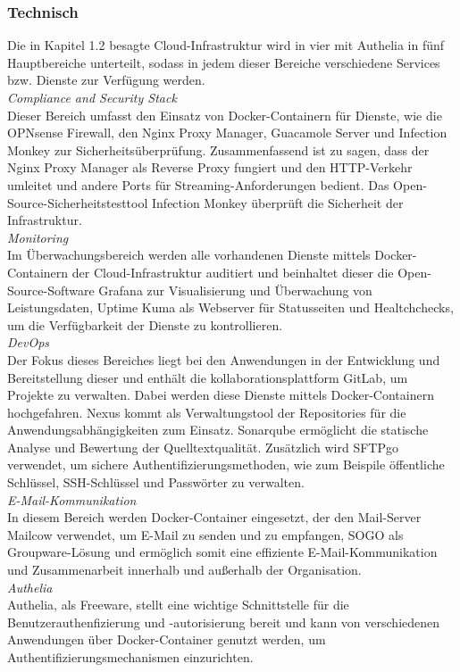 \subsubsection{Technisch}
\label{sec:Technisch}
Die in Kapitel 1.2 besagte Cloud-Infrastruktur wird in vier \bzw mit Authelia in fünf 
Hauptbereiche unterteilt, sodass in jedem dieser Bereiche verschiedene Services bzw. 
Dienste zur Verfügung werden.
\\\textit{Compliance and Security Stack}
\\Dieser Bereich umfasst den Einsatz von Docker-Containern für Dienste, wie die OPNsense Firewall, 
den Nginx Proxy Manager, Guacamole Server und Infection Monkey zur Sicherheitsüberprüfung. 
Zusammenfassend ist zu sagen, dass der Nginx Proxy Manager als Reverse Proxy fungiert und den HTTP-Verkehr 
umleitet und andere Ports für Streaming-Anforderungen bedient. Das Open-Source-Sicherheitstesttool 
Infection Monkey überprüft die Sicherheit der Infrastruktur.
\\\textit{Monitoring}
\\Im Überwachungsbereich werden alle vorhandenen Dienste mittels Docker-Containern der Cloud-Infrastruktur auditiert und beinhaltet dieser die Open-Source-Software Grafana zur Visualisierung und Überwachung von Leistungsdaten, Uptime Kuma als Webserver für Statusseiten und Healtchchecks, um die Verfügbarkeit der Dienste zu kontrollieren. 
\\\textit{DevOps}
\\Der Fokus dieses Bereiches liegt bei den Anwendungen in der Entwicklung und Bereitstellung dieser und enthält die kollaborationsplattform GitLab, um Projekte zu verwalten. Dabei werden diese Dienste mittels Docker-Containern hochgefahren. Nexus kommt als Verwaltungstool der Repositories für die Anwendungsabhängigkeiten zum Einsatz. Sonarqube ermöglicht die statische Analyse und Bewertung der Quelltextqualität. Zusätzlich wird SFTPgo verwendet, um sichere Authentifizierungsmethoden, wie zum Beispile öffentliche Schlüssel, SSH-Schlüssel und Passwörter zu verwalten.
\\\textit{E-Mail-Kommunikation}
\\In diesem Bereich werden Docker-Container eingesetzt, der den Mail-Server Mailcow verwendet, um E-Mail zu senden und zu empfangen, SOGO als Groupware-Lösung und ermöglich somit eine effiziente E-Mail-Kommunikation und Zusammenarbeit innerhalb und außerhalb der Organisation.
\\\textit{Authelia}
\\Authelia, als Freeware, stellt eine wichtige Schnittstelle für die Benutzerauthenfizierung und -autorisierung bereit und kann von verschiedenen Anwendungen über Docker-Container genutzt werden, um Authentifizierungsmechanismen einzurichten.
